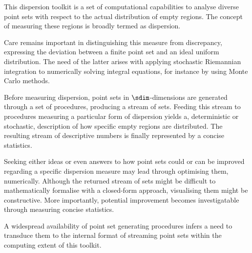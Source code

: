This dispersion toolkit is a set of computational capabilities to analyse diverse  point sets with respect to the actual distribution of empty regions. The concept of measuring these regions is broadly termed as dispersion.

Care remains important in distinguishing this measure from discrepancy, expressing the deviation between a finite point set and an ideal uniform distribution. The need of the latter arises with applying stochastic Riemannian integration to numerically solving integral equations, for instance by using Monte Carlo methods.

Before measuring dispersion, point sets in $\sdim$-dimensions are generated through a set of procedures, producing a stream of sets. Feeding this stream to procedures measuring a particular form of dispersion yields a, deterministic or stochastic, description of how specific empty regions are distributed. The resulting stream of descriptive numbers is finally represented by a concise statistics.

Seeking either ideas or even answers to how point sets could or can be improved regarding a specific dispersion measure may lead through optimising them, numerically. Although the returned stream of sets might be difficult to mathematically formalise with a closed-form approach, visualising them might be constructive. More importantly, potential improvement becomes investigatable through measuring concise statistics.

A widespread availability of point set generating procedures infers a need to transduce them to the internal format of streaming point sets within the computing extent of this toolkit.

\clearpage

